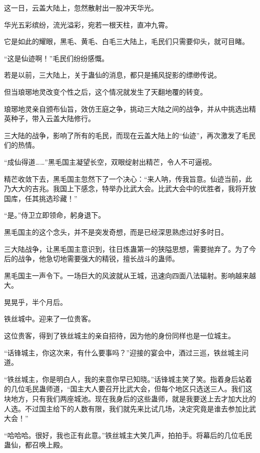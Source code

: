 
\begin{this_body}



这一日，云盖大陆上，忽然散射出一股冲天华光。

华光五彩缤纷，流光溢彩，宛若一根天柱，直冲九霄。

它是如此的耀眼，黑毛、黄毛、白毛三大陆上，毛民们只需要仰头，就可目睹。

“这是仙迹啊！”毛民们纷纷感慨。

若是以前，三大陆上，关于蛊仙的消息，都只是捕风捉影的缥缈传说。

但当琅琊地灵改变个性之后，这个情况就发生了天翻地覆的转变。

琅琊地灵亲自颁布仙旨，效仿王庭之争，挑动三大陆之间的战争，并从中挑选出精英种子，带入云盖大陆修行。

三大陆的战争，影响了所有的毛民，而现在云盖大陆上的“仙迹”，再次激发了毛民们的热情。

“成仙得道……”黑毛国主凝望长空，双眼绽射出精芒，令人不可逼视。

精芒收敛下去，黑毛国主忽然下了一个决心：“来人呐，传我旨意。仙迹当前，此乃大大的吉兆。我国上下感念，特举办比武大会。比武大会中的优胜者，我将开放国库，任其挑选珍藏！”

“是。”侍卫立即领命，躬身退下。

黑毛国主的这个念头，并不是突发奇想，而是已经深思熟虑过好多时日。

三大陆战争，让黑毛国主意识到，往日炼蛊第一的狭隘思想，需要抛弃了。为了今后的战争，他急切地需要强大的精锐，擅长战斗的蛊师。

黑毛国主一声令下。一场巨大的风波就从王城，迅速向四面八法辐射。影响越来越大。

晃晃乎，半个月后。

铁丝城中。迎来了一位贵客。

这位贵客，得到了铁丝城主的亲自招待，因为他的身份同样也是一位城主。

“话锋城主，你这次来，有什么要事吗？”迎接的宴会中，酒过三巡，铁丝城主问道。

“铁丝城主，你是明白人，我的来意你早已知晓。”话锋城主笑了笑。指着身后站着的几位毛民蛊师道，“国主大人要召开比武大会，但每个地区只选送三人。我们这块地方，只有我们两座城池。现在我身后的这些蛊师，就是我要送上去才加大比的人选。不过国主给下的人数有限，我们就先来比试几场，决定究竟是谁去参加比武大会！”

“哈哈哈。很好，我也正有此意。”铁丝城主大笑几声，拍拍手。将幕后的几位毛民蛊仙，都召唤上殿。


\end{this_body}
